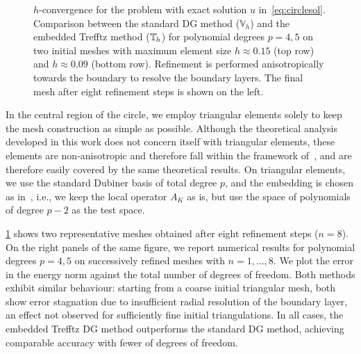 \documentclass[a4paper,twoside,10pt]{article}
\newcommand*{\norm}[1]{\left\|#1\right\|}
\numberwithin{equation}{section}
\newcommand{\Vh}{\mathbb{V}_{\! h}}
\newcommand{\ITh}{\mathbb{T}_{\mspace{-1.5mu} h}}
\begin{document}
\begin{figure}[ht!]
\begin{minipage}{0.7\textwidth}
{
    }
\end{minipage}
    \caption{$h$-convergence for the problem with exact solution $u$ in~\eqref{eq:circlesol}.
        Comparison between the standard DG method ($\Vh$) and the embedded Trefftz method ($\ITh$) for polynomial degrees $p=4,5$ on two initial meshes with maximum element size $h\approx 0.15$ (top row) and $h\approx 0.09$ (bottom row).
		Refinement is performed anisotropically towards the boundary to resolve the boundary layers. The final mesh after eight refinement steps is shown on the left.
    }
    \label{fig:curved}
\vspace{-.5em}
\end{figure}

In the central region of the circle, we employ triangular elements solely to keep the mesh construction as simple as possible.
Although the theoretical analysis developed in this work does not concern itself with triangular elements, these elements are non-anisotropic and therefore fall within the framework of~\cite{LLSV_ARXIV_2024}, and are therefore easily covered by the same theoretical results.
On triangular elements, we use the standard Dubiner basis of total degree $p$, and the embedding is chosen as in~\cite{LLSV_ARXIV_2024}, i.e., we keep the local operator $A_K$ as is, but use the 
space of polynomials of degree $p-2$ as the test space.

\cref{fig:curved} shows two representative meshes obtained after eight refinement steps ($n=8$). On the right panels of the same figure, we report numerical results for polynomial degrees $p=4,5$ on successively refined meshes with $n=1,\dots,8.$
We plot the error in the energy norm against the total number of degrees of freedom.
Both methods exhibit similar behaviour: starting from a coarse initial triangular mesh, both show error stagnation due to insufficient radial resolution of the boundary layer, an effect not observed for sufficiently fine initial triangulations.
In all cases, the embedded Trefftz DG method outperforms the standard DG method,
achieving comparable accuracy with fewer
of degrees of freedom.
\end{document}
